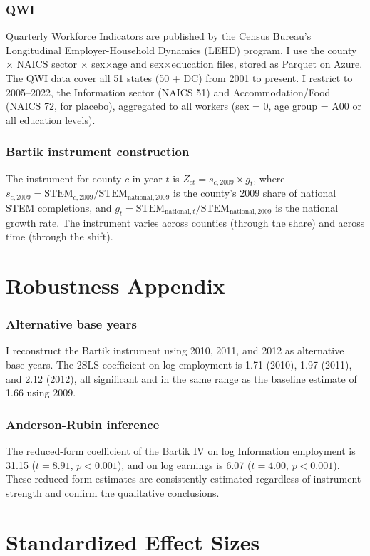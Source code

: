 \documentclass[12pt]{article}
\begin{document}
\subsubsection*{QWI} Quarterly Workforce Indicators are published by the Census Bureau's Longitudinal Employer-Household Dynamics (LEHD) program. I use the county $\times$ NAICS sector $\times$ sex$\times$age and sex$\times$education files, stored as Parquet on Azure. The QWI data cover all 51 states (50 + DC) from 2001 to present. I restrict to 2005--2022, the Information sector (NAICS 51) and Accommodation/Food (NAICS 72, for placebo), aggregated to all workers (sex = 0, age group = A00 or all education levels).

\subsubsection*{Bartik instrument construction} The instrument for county $c$ in year $t$ is $Z_{ct} = s_{c,2009} \times g_t$, where $s_{c,2009} = \text{STEM}_{c,2009} / \text{STEM}_{\text{national},2009}$ is the county's 2009 share of national STEM completions, and $g_t = \text{STEM}_{\text{national},t} / \text{STEM}_{\text{national},2009}$ is the national growth rate. The instrument varies across counties (through the share) and across time (through the shift).

\section{Robustness Appendix}

\subsubsection*{Alternative base years} I reconstruct the Bartik instrument using 2010, 2011, and 2012 as alternative base years. The 2SLS coefficient on log employment is 1.71 (2010), 1.97 (2011), and 2.12 (2012), all significant and in the same range as the baseline estimate of 1.66 using 2009.

\subsubsection*{Anderson-Rubin inference} The reduced-form coefficient of the Bartik IV on log Information employment is 31.15 ($t = 8.91$, $p < 0.001$), and on log earnings is 6.07 ($t = 4.00$, $p < 0.001$). These reduced-form estimates are consistently estimated regardless of instrument strength and confirm the qualitative conclusions.

\section{Standardized Effect Sizes}
\label{sec:sde}


\end{document}
